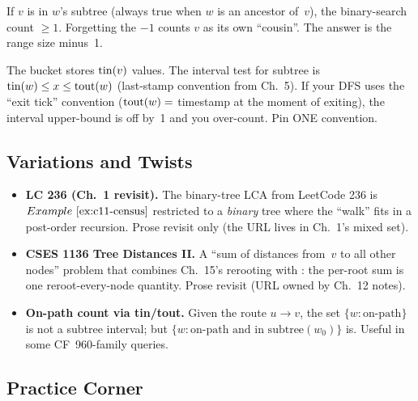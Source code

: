 \begin{warningbox}
If \(v\) is in \(w\)'s subtree (always true when \(w\) is an ancestor
of~\(v\)), the binary-search count \(\ge 1\).  Forgetting the \(-1\)
counts \(v\) as its own ``cousin''.  The answer is the range size minus~1.
\end{warningbox}

\begin{warningbox}
The bucket stores \(\operatorname{tin}(v)\) values.  The interval test for subtree is
\(\operatorname{tin}(w) \le x \le \operatorname{tout}(w)\) (last-stamp convention from Ch.~5).  If
your DFS uses the ``exit tick'' convention (\(\operatorname{tout}(w) =\) timestamp at
the moment of exiting), the interval upper-bound is off by~1 and you
over-count.  Pin ONE convention.
\end{warningbox}

\subsection{Variations and Twists}

\begin{itemize}[nosep]
  \item \textbf{LC 236 (Ch.~1 revisit).}  The binary-tree LCA from
        LeetCode 236 is \(\exref{c11-census}\) restricted to a
        \emph{binary} tree where the ``walk'' fits in a post-order
        recursion.  Prose revisit only (the URL lives in Ch.~1's mixed
        set).  \hfill{}
  \item \textbf{CSES 1136 Tree Distances II.}  A ``sum of distances
        from~\(v\) to all other nodes'' problem that combines Ch.~15's
        rerooting with : the per-root sum is one
        reroot-every-node quantity.  Prose revisit (URL owned by Ch.~12
        notes).  \hfill{}
  \item \textbf{On-path count via tin/tout.}  Given the route \(u\to v\),
        the set \(\{w : \text{on-path}\}\) is not a subtree interval;
        but \(\{w : \text{on-path and in subtree}(w_0)\}\) is.  Useful in
        some CF~960-family queries.  \hfill{}
\end{itemize}

\subsection{Practice Corner}


